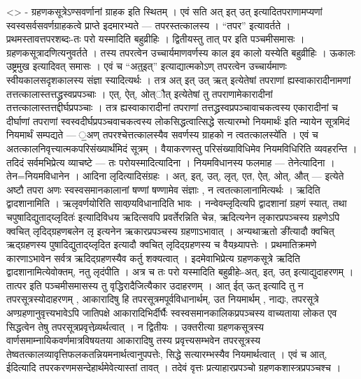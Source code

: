 \textless{}\textgreater{} - ग्रहणकसूत्रेऽण्सवर्णानां ग्राहक इति स्थितम्
। एवं सति अत् इत् उत् इत्यादितपराणामप्यणां स्वस्वसर्वसवर्णग्राहकत्वे
प्राप्ते इदमारभ्यते --- तपरस्तत्कालस्य । ``तपर'' इत्यावर्तते ।
प्रथमस्तावत्तपरशब्दः-तः परो यस्मादिति बहुव्रीहिः । द्वितीयस्तु तात् पर
इति पञ्चमीसमासः । ग्रहणकसूत्रादणित्यनुवर्तते । तस्य तपरत्वेन
उच्चार्यमाणवर्णस्य काल इव कालो यस्येति बहुव्रीहिः । ऊकालः उष्ट्रमुख
इत्यादिवत् समासः । एवं च ``अत्॒इत्'' इत्याद्यात्मकोऽण् तपरत्वेन
उच्चार्यमाणः स्वीयकालसदृशकालस्य संज्ञा स्यादित्यर्थः । तत्र अत् इत् उत्
ऋत् इत्येतेषां तपराणां ह्यस्वाकारादीनामणां
तत्तत्कालास्तत्तद्ध्रस्वप्रपञ्चाः । एत्, ऐत्, ओत्ौत् इत्येतेषां तु
तपराणामेकारादीनां तत्तत्कालास्तत्तद्दीर्घप्रपञ्चाः । तत्र
ह्यस्वाकारादीनां तपराणां तत्तद्ध्रस्वप्रपञ्चावाचकत्वस्य एकारादीनां च
दीर्घाणां तपराणां स्वस्वदीर्घप्रपञ्चवाचकत्वस्य लोकसिद्धत्वात्सिद्धे
सत्यारम्भो नियमार्थः॑ इति न्यायेन सूत्रमिदं नियमार्थं सम्पद्यते --- ॒अण्
तपरश्चेत्तत्कालस्यैव सवर्णस्य ग्राहको न त्वतत्कालस्ये॑ति । एवं च
अतत्कालनिवृत्त्यात्मकपरिसंख्यार्थंमिदं सूत्रम् । वैयाकरणस्तु
परिसंख्याविधिमेव नियमविधिरिति व्यवहरन्ति । तदिदं सर्वमभिप्रेत्य
व्याचष्टे --- तः परोयस्मादित्यादिना । नियमविधानस्य फलमाह ---
तेनेत्यादिना । तेन=नियमविधानेन । आदिना लृदित्यादिसंग्रहः । अत्, इत्,
उत्, लृत्, एत, ऐत्, ओत्, औत् --- इत्येते अष्टौ तपरा अणः
स्वस्वसमानकालानां षण्णां षण्णामेव संज्ञाः , न त्वतत्कालानामित्यर्थः ।
ऋदिति द्वादशानामिति । ऋलृवर्णयोरिति सावण्र्यविधानादिति भावः ।
नन्वेवम्लृदित्यपि द्वादशानां ग्रहणं स्यात्, तथा चपुषादिद्युताद्य्लृदितः॑
इत्यादिविधय ऋदित्सवपि प्रवर्तेरन्निति चेन्न, ऋदित्यनेन लृकारप्रपञ्चस्य
ग्रहणेऽपि क्वचित् लृदिद्ग्रहणबलेन लृ इत्यनेन ऋकारप्रपञ्चस्य
ग्रहणाऽभावात् । अन्यथाऋतो ङी॑त्यादौ क्वचित् ऋद्ग्रहणस्य
पुषादिद्युताद्य्लृदित इत्यादौ क्वचित् लृदिद्ग्रहणस्य च वैयथ्र्यापत्तेः ।
प्रथमातिक्रमणे कारणाऽभावेन सर्वत्र ऋदिद्ग्रहणस्यैव कर्तु शक्यत्वात् ।
इदमेवाभिप्रेत्य ग्रहणकसूत्रे ऋदिति द्वादशानामित्येवोक्तम्, नतु लृदंपीति
। अत्र च तः परो यस्मादिति बहुव्रीहेः-अत्, इत्, उत् इत्याद्युदाहरणम् ।
तात्पर इति पञ्चमीसमासस्य तु वृद्धिरादैजित्यैकार उदाहरणम् । आत् ईत् ऊत्
इत्यादि तु न तपरसूत्रस्योदाहरणम् , आकारादिषु हि
तपरसूत्रमपूर्वविधानार्थम्, उत नियमार्थम् , नाद्यः, तपरसूत्रे
अण्ग्रहणानुवृत्त्यभावेऽपि जातिपक्षे आकारादिभिर्दीर्घैः
स्वस्वसमानकालिकप्रपञ्चस्य वाच्यताया लोकत एव सिद्धत्वेन तेषु
तपरसूत्रप्रवृत्तेव्र्यर्थत्वात् । न द्वितीयः । उक्तरीत्या ग्रहणकसूत्रस्य
वार्णसमाम्नायिकवर्णमात्रविषयतया आकारादिषु तस्य प्रवृत्त्यसम्भवेन
तपरसूत्रस्य तेष्वतत्कालव्यावृत्तिफलकतन्नियमनार्थत्वानुपपत्तेः, सिद्धे
सत्यारम्भस्यैव नियमार्थत्वात् । एवं च आत्, ईदित्यादि
तपरकरणमसन्देहार्थमेवेत्यास्तां तावत् । तदेवं वृत्तः प्रत्याहारप्रपञ्चो
ग्रहणकशास्त्रप्रपञ्चश्च ।
